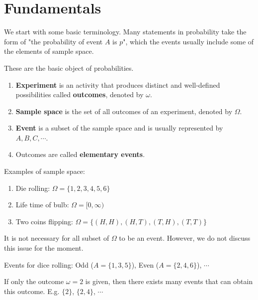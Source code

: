 \documentclass{huhtakm-template-book}
\begin{document}
\section{Fundamentals}
We start with some basic terminology. Many statements in probability take the form of "the probability of event $A$ is $p$", which the events usually include some of the elements of sample space.
\begin{defn}
	These are the basic object of probabilities.
	\begin{enumerate}
		\item \textbf{Experiment} is an activity that produces distinct and well-defined possibilities called \textbf{outcomes}, denoted by $\omega$.
		\item \textbf{Sample space} is the set of all outcomes of an experiment, denoted by $\Omega$.
		\item \textbf{Event} is a subset of the sample space and is usually represented by $A,B,C,\cdots$.
		\item Outcomes are called \textbf{elementary events}.
	\end{enumerate}	
\end{defn}
\begin{eg}
	Examples of sample space:
	\begin{enumerate}
		\item Die rolling: $\Omega=\{1,2,3,4,5,6\}$
		\item Life time of bulb: $\Omega=[0,\infty)$
		\item Two coins flipping: $\Omega=\{(H,H),(H,T),(T,H),(T,T)\}$
	\end{enumerate} 
\end{eg}
\begin{rem}
	It is not necessary for all subset of $\Omega$ to be an event. However, we do not discuss this issue for the moment.
\end{rem}
\begin{eg}
	Events for dice rolling: Odd ($A=\{1,3,5\}$), Even ($A=\{2,4,6\}$), $\cdots$
\end{eg}
\begin{rem}
	If only the outcome $\omega=2$ is given, then there exists many events that can obtain this outcome. E.g. $\{2\}$, $\{2,4\}$, $\cdots$
\end{rem}
\end{document}
